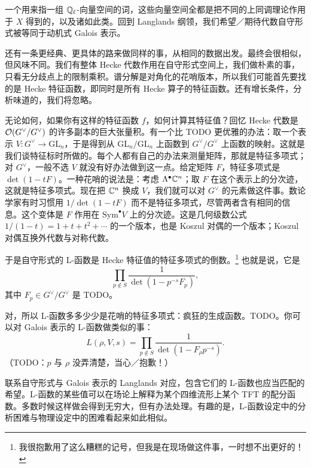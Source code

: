 
一个用来指一组 $\mathbb{Q}_\ell$-向量空间的词，这些向量空间全都是把不同的上同调理论作用于 $X$ 得到的，以及诸如此类。回到 Langlands 纲领，我们希望／期待代数自守形式被等同于动机式 Galois 表示。

还有一条更经典、更具体的路来做同样的事，从相同的数据出发。最终会很相似，但风味不同。我们有整体 Hecke 代数作用在自守形式空间上，我们做朴素的事，只看无分歧点上的限制乘积。谱分解是对角化的花哨版本，所以我们可能首先要找的是 Hecke 特征函数，即同时是所有 Hecke 算子的特征函数。还有增长条件，分析味道的，我们将忽略。

无论如何，如果你有这样的特征函数 $f$，如何计算其特征值？回忆 Hecke 代数是 $\mathcal{O}(G^\vee/G^\vee)$ 的许多副本的巨大张量积。有一个比 TODO 更优雅的办法：取一个表示 $V\colon G^\vee\to\mathrm{GL}_n$，于是得到从 $\mathrm{GL}_n/\mathrm{GL}_n$ 上函数到 $G^\vee/G^\vee$ 上函数的映射。这就是我们谈特征标时所做的。每个人都有自己的办法来测量矩阵，那就是特征多项式；对 $G^\vee$，一般不选 $V$ 就没有好办法做到这一点。给定矩阵 $F$，特征多项式是 $\det(1-tF)$。一种花哨的说法是：考虑 $\Lambda^\bullet\mathbb{C}^n$；取 $F$ 在这个表示上的分次迹，这就是特征多项式。现在把 $\mathbb{C}^n$ 换成 $V$，我们就可以对 $G^\vee$ 的元素做这件事。数论学家有时习惯用 $1/\det(1-tF)$ 而不是特征多项式，尽管两者含有相同的信息。这个变体是 $F$ 作用在 $\mathrm{Sym}^\bullet V$ 上的分次迹。这是几何级数公式 $1/(1-t)=1+t+t^2+\cdots$ 的一个版本，也是 Koszul 对偶的一个版本；Koszul 对偶互换外代数与对称代数。

于是自守形式的 L-函数是 Hecke 特征值的特征多项式的倒数。\footnote{我很抱歉用了这么糟糕的记号，但我是在现场做这件事，一时想不出更好的！}
也就是说，它是
\[
\prod_{p\notin S}\frac{1}{\det(1-p^{-s}F_p)},
\]
其中 $F_p\in G^\vee/G^\vee$ 是 TODO。

对，所以 L-函数多多少少是花哨的特征多项式：疯狂的生成函数。TODO。你可以对 Galois 表示的 L-函数做类似的事：
\[
L(\rho,V,s)=\prod_{p\notin S}\frac{1}{\det(1-F_\rho p^{-s})}.
\]
（TODO：$p$ 与 $\rho$ 没弄清楚，当心／抱歉！）

联系自守形式与 Galois 表示的 Langlands 对应，包含它们的 L-函数也应当匹配的希望。L-函数的某些值可以在场论上解释为某个四维流形上某个 TFT 的配分函数。多数时候这样做会得到无穷大，但有办法处理。有趣的是，L-函数设定中的分析困难与物理设定中的困难看起来如此相似。
